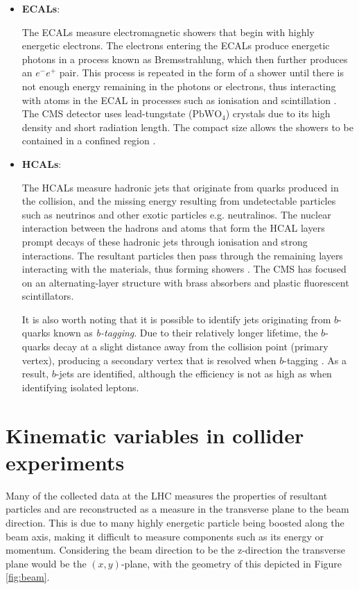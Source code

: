 \begin{itemize}
  \item \textbf{ECALs}: \par
  The ECALs measure electromagnetic showers that begin with highly energetic electrons. The electrons entering the ECALs produce energetic photons in a process known as Bremsstrahlung, which then further produces an $e^{-}e^{+}$ pair. This process is repeated in the form of a shower until there is not enough energy remaining in the photons or electrons, thus interacting with atoms in the ECAL in processes such as ionisation and scintillation \cite{thomson2013modern}. The CMS detector uses lead-tungstate ($\text{PbWO}_4$) crystals due to its high density and short radiation length. The compact size allows the showers to be contained in a confined region \cite{chatrchyan2008cms}. 
  
  \item \textbf{HCALs}: \par
  The HCALs measure hadronic jets that originate from quarks produced in the collision, and the missing energy resulting from undetectable particles such as neutrinos and other exotic particles e.g. neutralinos. The nuclear interaction between the hadrons and atoms that form the HCAL layers prompt decays of these hadronic jets through ionisation and strong interactions. The resultant particles then pass through the remaining layers interacting with the materials, thus forming showers \cite{thomson2013modern}. The CMS has focused on an alternating-layer structure with brass absorbers and plastic fluorescent scintillators. \par
  
  It is also worth noting that it is possible to identify jets originating from $b$-quarks known as \textit{b-tagging}. Due to their relatively longer lifetime, the $b$-quarks decay at a slight distance away from the collision point (primary vertex), producing a secondary vertex that is resolved when $b$-tagging \cite{thomson2013modern}. As a result, $b$-jets are identified, although the efficiency is not as high as when identifying isolated leptons. 
\end{itemize}




\section{Kinematic variables in collider experiments}
Many of the collected data at the LHC measures the properties of resultant particles and are reconstructed as a measure in the transverse plane to the beam direction. This is due to many highly energetic particle being boosted along the beam axis, making it difficult to measure components such as its energy or momentum. Considering the beam direction to be the z-direction the transverse plane would be the $(x,y)$-plane, with the geometry of this depicted in Figure \ref{fig:beam}. \\

